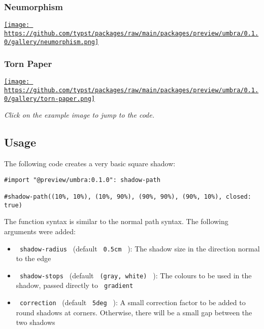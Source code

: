 \subsubsection{Neumorphism}\label{neumorphism}

\href{https://github.com/typst/packages/raw/main/packages/preview/umbra/0.1.0/gallery/neumorphism.typ}{\texttt{[image: https://github.com/typst/packages/raw/main/packages/preview/umbra/0.1.0/gallery/neumorphism.png]}}

\subsubsection{Torn Paper}\label{torn-paper}

\href{https://github.com/typst/packages/raw/main/packages/preview/umbra/0.1.0/gallery/torn-paper.typ}{\texttt{[image: https://github.com/typst/packages/raw/main/packages/preview/umbra/0.1.0/gallery/torn-paper.png]}}

\emph{Click on the example image to jump to the code.}

\subsection{Usage}\label{usage}

The following code creates a very basic square shadow:

\begin{verbatim}
#import "@preview/umbra:0.1.0": shadow-path

#shadow-path((10%, 10%), (10%, 90%), (90%, 90%), (90%, 10%), closed: true)
\end{verbatim}

The function syntax is similar to the normal path syntax. The following
arguments were added:

\begin{itemize}
\tightlist
\item
  \texttt{\ shadow-radius\ } (default \texttt{\ 0.5cm\ } ): The shadow
  size in the direction normal to the edge
\item
  \texttt{\ shadow-stops\ } (default \texttt{\ (gray,\ white)\ } ): The
  colours to be used in the shadow, passed directly to
  \texttt{\ gradient\ }
\item
  \texttt{\ correction\ } (default \texttt{\ 5deg\ } ): A small
  correction factor to be added to round shadows at corners. Otherwise,
  there will be a small gap between the two shadows
\end{itemize}

